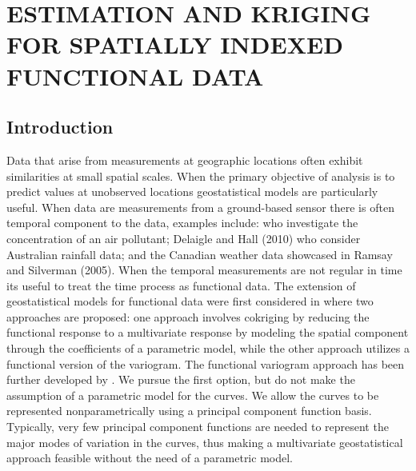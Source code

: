 

\chapter{ESTIMATION AND KRIGING FOR SPATIALLY INDEXED FUNCTIONAL DATA} 
\label{ch:functional kriging}

\section{Introduction} 

\label{sec:introduction}
Data that arise from measurements at geographic locations often exhibit similarities at small spatial scales. When the primary objective of analysis is to predict values at unobserved locations geostatistical models are particularly useful. When data are measurements from a ground-based sensor there is often temporal component to the data, examples include: \cite{Kaiser:2002wna} who investigate the concentration of an air pollutant; Delaigle and Hall (2010) who consider Australian rainfall data; and the Canadian weather data showcased in Ramsay and Silverman (2005). When the temporal measurements are not regular in time its useful to treat the time process as functional data. The extension of geostatistical models for functional data were first considered in \cite{Goulard:1993} where two approaches are proposed: one approach involves cokriging by reducing the functional response to a multivariate response by modeling the spatial component through the coefficients of a parametric model, while the other approach utilizes a functional version of the variogram. The functional variogram approach has been further developed by \cite{Giraldo:2010jx}. We pursue the first option, but do not make the assumption of a parametric model for the curves. We allow the curves to be represented nonparametrically using a principal component function basis. Typically, very few principal component functions are needed to represent the major modes of variation in the curves, thus making a multivariate geostatistical approach feasible without the need of a parametric model. 




